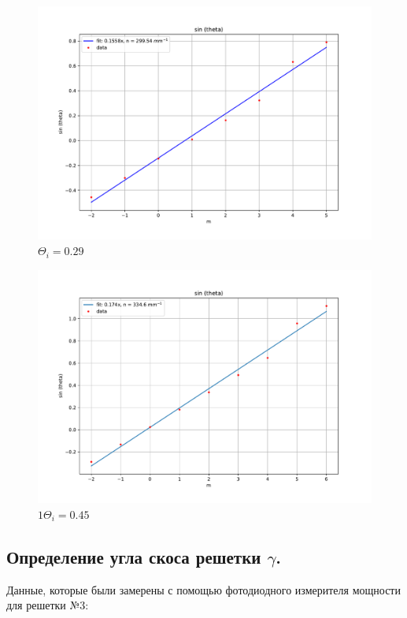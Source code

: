 \documentclass[a4paper, 12pt]{article}
\begin{document}
\begin{figure}[H]
	\centering
	\includegraphics[scale=0.55]{3_2}
	\caption{$\Theta_i = 0.29$}
\end{figure}


\begin{figure}[H]
	\centering
	\includegraphics[scale=0.6]{3_4}
	\caption{$1\Theta_i = 0.45$}
\end{figure}





\subsection{Определение угла скоса решетки $\gamma$.}

Данные, которые были замерены с помощью фотодиодного измерителя мощности для решетки №3:
\end{document}
